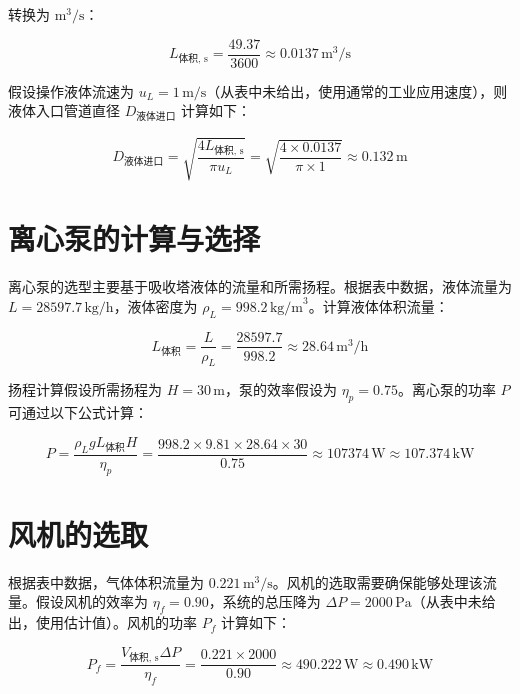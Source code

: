 转换为 $\text{m}^3/\text{s}$：

\begin{equation}
	L_{\text{体积, s}} = \frac{49.37}{3600} \approx 0.0137 \, \text{m}^3/\text{s}
\end{equation}

假设操作液体流速为 $u_L = 1 \, \text{m/s}$（从表中未给出，使用通常的工业应用速度），则液体入口管道直径 $D_{\text{液体进口}}$ 计算如下：

\begin{equation}
	D_{\text{液体进口}} = \sqrt{\frac{4L_{\text{体积, s}}}{\pi u_L}} = \sqrt{\frac{4 \times 0.0137}{\pi \times 1}} \approx 0.132 \, \text{m}
\end{equation}

\section{离心泵的计算与选择}

离心泵的选型主要基于吸收塔液体的流量和所需扬程。根据表中数据，液体流量为 $L = 28597.7 \, \text{kg/h}$，液体密度为 $\rho_L = 998.2 \, \text{kg/m}^3$。计算液体体积流量：

\begin{equation}
	L_{\text{体积}} = \frac{L}{\rho_L} = \frac{28597.7}{998.2} \approx 28.64 \, \text{m}^3/\text{h}
\end{equation}

扬程计算假设所需扬程为 $H = 30 \, \text{m}$，泵的效率假设为 $\eta_p = 0.75$。离心泵的功率 $P$ 可通过以下公式计算：

\begin{equation}
	P = \frac{\rho_L g L_{\text{体积}} H}{\eta_p} = \frac{998.2 \times 9.81 \times 28.64 \times 30}{0.75} \approx 107374 \, \text{W} \approx 107.374 \, \text{kW}
\end{equation}

\section{风机的选取}

根据表中数据，气体体积流量为 $0.221 \, \text{m}^3/\text{s}$。风机的选取需要确保能够处理该流量。假设风机的效率为 $\eta_f = 0.90$，系统的总压降为 $\Delta P = 2000 \, \text{Pa}$（从表中未给出，使用估计值）。风机的功率 $P_f$ 计算如下：

\begin{equation}
	P_f = \frac{V_{\text{体积, s}} \Delta P}{\eta_f} = \frac{0.221 \times 2000}{0.90} \approx 490.222 \, \text{W} \approx 0.490 \, \text{kW}
\end{equation}